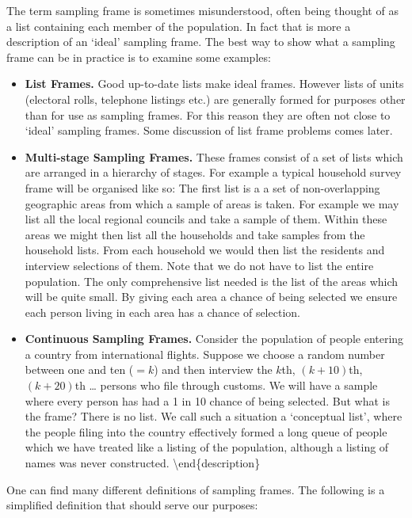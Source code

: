 \documentclass[
]{book}
\begin{document}
The term sampling frame is sometimes misunderstood, often being thought of as a
list containing each member of the population. In fact that is more a
description of an `ideal' sampling frame. The best way to show what a sampling
frame can be in practice is to examine some examples:

\begin{itemize}
\item
  \textbf{List Frames.} Good up-to-date lists make ideal frames. However lists of
  units (electoral rolls, telephone listings etc.) are generally formed for
  purposes other than for use as sampling frames. For this reason they are
  often not close to `ideal' sampling frames. Some discussion of list frame
  problems comes later.
\item
  \textbf{Multi-stage Sampling Frames.} These frames consist of a set of lists
  which are arranged in a hierarchy of stages. For example a typical household
  survey frame will be organised like so: The first list is a a set of
  non-overlapping geographic areas from which a sample of areas is taken. For
  example we may list all the local regional councils and take a sample of
  them. Within these areas we might then list all the households and take
  samples from the household lists. From each household we would then list the
  residents and interview selections of them. Note that we do not have to list
  the entire population. The only comprehensive list needed is the list of the
  areas which will be quite small. By giving each area a chance of being
  selected we ensure each person living in each area has a chance of selection.
\item
  \textbf{Continuous Sampling Frames.} Consider the population of people entering a
  country from international flights. Suppose we choose a random number
  between one and ten (\(=k\)) and then interview the \(k\)th, \((k+10)\)th,
  \((k+20)\)th \ldots{} persons who file through customs. We will have a sample where
  every person has had a 1 in 10 chance of being selected. But what is the
  frame? There is no list. We call such a situation a `conceptual list', where
  the people filing into the country effectively formed a long queue of people
  which we have treated like a listing of the population, although a listing of
  names was never constructed. \textbackslash end\{description\}
\end{itemize}

One can find many different definitions of sampling frames. The following is a
simplified definition that should serve our purposes:
\end{document}

